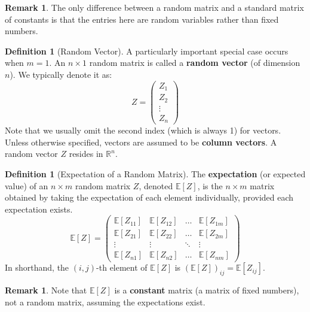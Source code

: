 \documentclass[11pt]{article}
\theoremstyle{definition}
\newtheorem{definition}[theorem]{Definition}
\newtheorem{remark}[theorem]{Remark}
\newcommand{\E}{\mathbb{E}}
\begin{document}
\begin{remark}
The only difference between a random matrix and a standard matrix of constants is that the entries here are random variables rather than fixed numbers.
\end{remark}

\begin{definition}[Random Vector]
A particularly important special case occurs when $m=1$. An $n \times 1$ random matrix is called a \textbf{random vector} (of dimension $n$). We typically denote it as:
\[ Z = \begin{pmatrix} Z_1 \\ Z_2 \\ \vdots \\ Z_n \end{pmatrix} \]
Note that we usually omit the second index (which is always 1) for vectors. Unless otherwise specified, vectors are assumed to be \textbf{column vectors}. A random vector $Z$ resides in $\mathbb{R}^n$.
\end{definition}

\begin{definition}[Expectation of a Random Matrix]
The \textbf{expectation} (or expected value) of an $n \times m$ random matrix $Z$, denoted $\E[Z]$, is the $n \times m$ matrix obtained by taking the expectation of each element individually, provided each expectation exists.
\[ \E[Z] = \begin{pmatrix} \E[Z_{11}] & \E[Z_{12}] & \dots & \E[Z_{1m}] \\ \E[Z_{21}] & \E[Z_{22}] & \dots & \E[Z_{2m}] \\ \vdots & \vdots & \ddots & \vdots \\ \E[Z_{n1}] & \E[Z_{n2}] & \dots & \E[Z_{nm}] \end{pmatrix} \]
In shorthand, the $(i,j)$-th element of $\E[Z]$ is $(\E[Z])_{ij} = \E[Z_{ij}]$.
\end{definition}

\begin{remark}
Note that $\E[Z]$ is a \textbf{constant} matrix (a matrix of fixed numbers), not a random matrix, assuming the expectations exist.
\end{remark}
\end{document}
